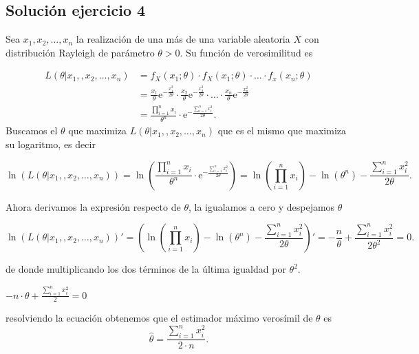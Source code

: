 \documentclass[
]{article}
\begin{document}
\hypertarget{soluciuxf3n-ejercicio-4}{%
\subsection{Solución ejercicio 4}\label{soluciuxf3n-ejercicio-4}}

Sea \(x_1,x_2,\ldots,x_n\) la realización de una más de una variable
aleatoria \(X\) con distribución Rayleigh de parámetro \(\theta >0\). Su
función de verosimilitud es

\[ 
\begin{array}{rl}
L(\theta|x_1,,x_2,\ldots,x_n)&=   f_X(x_1;\theta)\cdot f_X(x_1;\theta)\cdot \ldots \cdot f_x(x_n;\theta)\\
& =\frac{x_1}{\theta}\mathrm{e}^{-\frac{x_1^2}{2\theta}}\cdot\frac{x_2}{\theta} \mathrm{e}^{-\frac{x_2^2}{2\theta}}\cdot\ldots\cdot \frac{x_n}{\theta} \mathrm{e}^{-\frac{x_n^2}{2\theta}}\\
& = \frac{\prod_{i=1}^n x_i}{\theta^n} \cdot \mathrm{e}^{-\frac{ \sum_{i=1}^n x_i^2}{2\theta}}.
\end{array}
\] Buscamos el \(\theta\) que maximiza \(L(\theta|x_1,,x_2,\ldots,x_n)\)
que es el mismo que maximiza su logaritmo, es decir

\[
\ln(L(\theta|x_1,,x_2,\ldots,x_n))=\ln\left(\frac{\prod_{i=1}^n x_i}{\theta^n} \cdot \mathrm{e}^{-\frac{\sum_{i=1}^n x_i^2}{2\theta}}\right)=
\ln\left(\prod_{i=1}^n x_i\right)-\ln(\theta^n)-\frac{ \sum_{i=1}^n x_i^2}{2\theta}.
\]

Ahora derivamos la expresión respecto de \(\theta\), la igualamos a cero
y despejamos \(\theta\)

\[
\ln(L(\theta|x_1,,x_2,\ldots,x_n))'=\left(
\ln\left(\prod_{i=1}^n x_i\right)-\ln(\theta^n)-\frac{ \sum_{i=1}^n x_i^2}{2\theta}\right)'= -\frac{n}{\theta}+\frac{ \sum_{i=1}^n x_i^2}{2\theta^2}=0.
\]

de donde multiplicando los dos términos de la última igualdad por
\(\theta^2.\)

\(-n\cdot \theta+\frac{ \sum_{i=1}^n x_i^2}{2}=0\)

resolviendo la ecuación obtenemos que el estimador máximo verosímil de
\(\theta\) es \[\hat{\theta}= \frac{ \sum_{i=1}^n x_i^2}{2\cdot n}.\]
\end{document}
